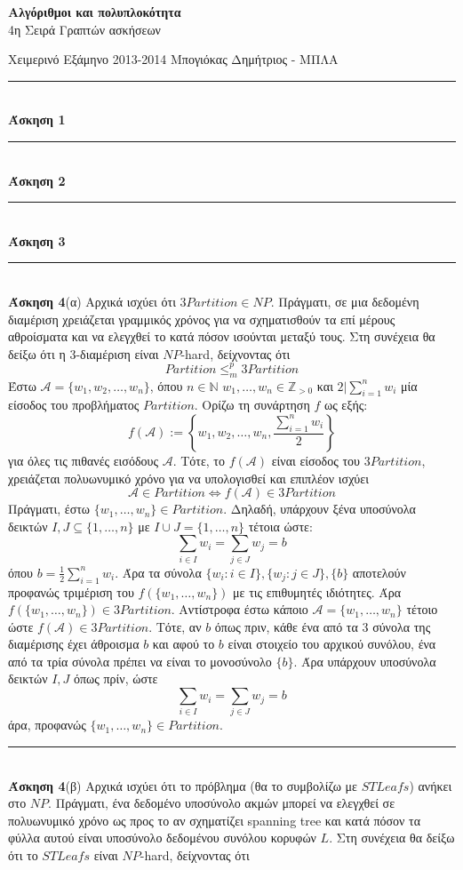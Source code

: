 \documentclass[12pt]{article}
\newcommand\en[1]{\latintext #1\greektext}
\newcommand{\HRule}{\rule{\linewidth}{0.1mm}}
\begin{document}
\begin{center}
{\bf Αλγόριθμοι και πολυπλοκότητα}\\
4η Σειρά Γραπτών ασκήσεων
\end{center}
Χειμερινό Εξάμηνο 2013-2014 \hfill Μπογιόκας Δημήτριος - ΜΠΛΑ
\HRule\\
{\bf Άσκηση 1}\\\HRule\\
{\bf Άσκηση 2}\\\HRule\\
{\bf Άσκηση 3}\\\HRule\\
{\bf Άσκηση 4}(α) Αρχικά ισχύει ότι $3Partition\in NP$. Πράγματι, σε μια δεδομένη διαμέριση χρειάζεται γραμμικός χρόνος για να σχηματισθούν τα επί μέρους αθροίσματα και να ελεγχθεί το κατά πόσον ισούνται μεταξύ τους. Στη συνέχεια θα δείξω ότι η 3-διαμέριση είναι $NP$-\en{hard}, δείχνοντας ότι
$$Partition\leq_m^p3Partition$$
Έστω $\mathcal{A}=\{w_1,w_2,\ldots,w_n\}$, όπου $n\in\mathbb{N}$ $w_1,\ldots,w_n\in\mathbb{Z}_{>0}$ και $2|\sum_{i=1}^nw_i$ μία είσοδος του προβλήματος $Partition$. Ορίζω τη συνάρτηση $f$ ως εξής:
$$f(\mathcal{A}):=\left\{w_1,w_2,\ldots,w_n,\frac{\sum_{i=1}^nw_i}{2}\right\}$$
για όλες τις πιθανές εισόδους $\mathcal{A}$. Τότε, το $f(\mathcal{A})$ είναι είσοδος του $3Partition$, χρειάζεται πολυωνυμικό χρόνο για να υπολογισθεί και επιπλέον ισχύει
$$\mathcal{A}\in Partition\Leftrightarrow f(\mathcal{A})\in3Partition$$
Πράγματι, έστω $\{w_1,\ldots,w_n\}\in Partition$. Δηλαδή, υπάρχουν ξένα υποσύνολα δεικτών $I,J\subseteq\{1,\ldots,n\}$ με $I\cup J=\{1,\ldots,n\}$ τέτοια ώστε:
$$\sum_{i\in I}w_i=\sum_{j\in J}w_j=b$$
όπου $b=\frac{1}{2}\sum_{i=1}^nw_i$. Άρα τα σύνολα $\{w_i:i\in I\},\{w_j:j\in J\},\{b\}$ αποτελούν προφανώς τριμέριση του $f(\{w_1,\ldots,w_n\})$ με τις επιθυμητές ιδιότητες. Άρα $f(\{w_1,\ldots,w_n\})\in3Partition$. Αντίστροφα έστω κάποιο $\mathcal{A}=\{w_1,\ldots,w_n\}$ τέτοιο ώστε $f(\mathcal{A})\in3Partition$. Τότε, αν $b$ όπως πριν, κάθε ένα από τα 3 σύνολα της διαμέρισης έχει άθροισμα $b$ και αφού το $b$ είναι στοιχείο του αρχικού συνόλου, ένα από τα τρία σύνολα πρέπει να είναι το μονοσύνολο $\{b\}$. Άρα υπάρχουν υποσύνολα δεικτών $I,J$ όπως πρίν, ώστε
$$\sum_{i\in I}w_i=\sum_{j\in J}w_j=b$$
άρα, προφανώς $\{w_1,\ldots,w_n\}\in Partition$.\\\HRule\\
{\bf Άσκηση 4}(β) Αρχικά ισχύει ότι το πρόβλημα (θα το συμβολίζω με $STLeafs$) ανήκει στο $NP$. Πράγματι, ένα δεδομένο υποσύνολο ακμών μπορεί να ελεγχθεί σε πολυωνυμικό χρόνο ως προς το αν σχηματίζει \en{spanning tree} και κατά πόσον τα φύλλα αυτού είναι υποσύνολο δεδομένου συνόλου κορυφών $L$. Στη συνέχεια θα δείξω ότι το $STLeafs$ είναι $NP$-\en{hard}, δείχνοντας ότι
\end{document}
